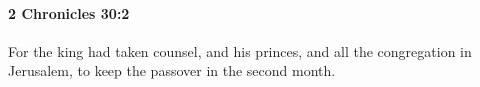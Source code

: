 
		\paragraph{2 Chronicles 30:2} %
			\label{2CHRONICLES-30-2}

			For the king had taken counsel, and his princes, and all the congregation in Jerusalem, to keep the passover in the second month.


